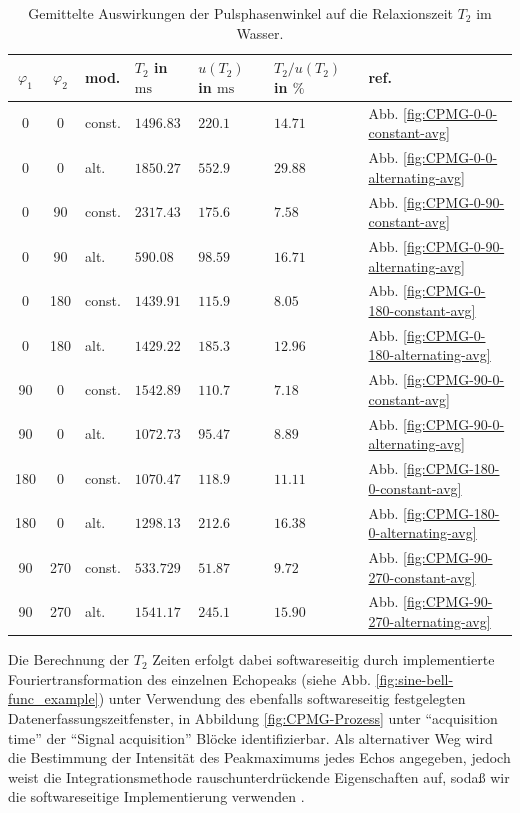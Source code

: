 \documentclass{article}
\begin{document}
        \begin{table}[H]
            \centering
            \begin{tabular}{c|c|l|lll|l}
                $\varphi_1$ & $\varphi_2$ & mod. & $T_2$ in $\si{\ms}$ & $u(T_2)$ in $\si{\ms}$ & $T_2/u(T_2)$ in $\si{\percent}$ & ref. \\
                \hline\hline
                0 & 0 & const. & $1496.83$ & $220.1$ & $14.71$ & Abb. \ref{fig:CPMG-0-0-constant-avg} \\
                0 & 0 & alt. & $1850.27$ & $552.9$ & $29.88$ & Abb. \ref{fig:CPMG-0-0-alternating-avg} \\
                \hline
                0 & 90 & const. & $2317.43$ & $175.6$ & $7.58$ & Abb. \ref{fig:CPMG-0-90-constant-avg} \\
                0 & 90 & alt. & $590.08$ & $98.59$ & $16.71$ & Abb. \ref{fig:CPMG-0-90-alternating-avg} \\
                \hline
                0 & 180 & const. & $1439.91$ & $115.9$ & $8.05$ & Abb. \ref{fig:CPMG-0-180-constant-avg} \\
                0 & 180 & alt. & $1429.22$ & $185.3$ & $12.96$ & Abb. \ref{fig:CPMG-0-180-alternating-avg} \\
                \hline
                90 & 0 & const. & $1542.89$ & $110.7$ & $7.18$ & Abb. \ref{fig:CPMG-90-0-constant-avg} \\
                90 & 0 & alt. & $1072.73$ & $95.47$ & $8.89$ & Abb. \ref{fig:CPMG-90-0-alternating-avg} \\
                \hline
                180 & 0 & const. & $1070.47$ & $118.9$ & $11.11$ & Abb. \ref{fig:CPMG-180-0-constant-avg} \\
                180 & 0 & alt. & $1298.13$ & $212.6$ & $16.38$ & Abb. \ref{fig:CPMG-180-0-alternating-avg} \\
                \hline
                90 & 270 & const. & $533.729$ & $51.87$ & $9.72$ & Abb. \ref{fig:CPMG-90-270-constant-avg} \\
                90 & 270 & alt. & $1541.17$ & $245.1$ & $15.90$ & Abb. \ref{fig:CPMG-90-270-alternating-avg} \\
            \end{tabular}
            \caption{Gemittelte Auswirkungen der Pulsphasenwinkel auf die Relaxionszeit $T_2$ im Wasser.}
            \label{tab:CPMG-avg}
        \end{table}
        Die Berechnung der $T_2$ Zeiten erfolgt dabei softwareseitig durch implementierte Fouriertransformation des einzelnen Echopeaks (siehe Abb. \ref{fig:sine-bell-func_example}) unter Verwendung des ebenfalls softwareseitig festgelegten Datenerfassungszeitfenster, in Abbildung \ref{fig:CPMG-Prozess} unter \enquote{acquisition time} der \enquote{Signal acquisition} Blöcke identifizierbar. Als alternativer Weg wird die Bestimmung der Intensität des Peakmaximums jedes Echos angegeben, jedoch weist die Integrationsmethode rauschunterdrückende Eigenschaften auf, sodaß wir die softwareseitige Implementierung verwenden \cite[ch 5.3.1]{doc:EFNMRStudentManual}. 
\end{document}
